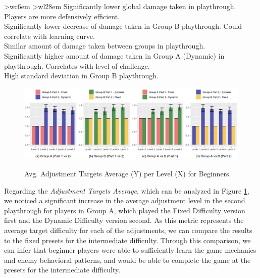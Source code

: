 \begin{table}[hbt!]
\begin{center}
\begin{tabular}{ >{\small}w{c}{6em} >{\footnotesize}w{l}{28em} }
        {
            \textbullet\space Significantly lower global damage taken in  playthrough. Players are more defensively efficient. \\ %
            \textbullet\space Significantly lower decrease of damage taken in Group B  playthrough. Could correlate with learning curve. \\ %
            \textbullet\space Similar amount of damage taken between groups in  playthrough. \\ %
            \textbullet\space Significantly higher amount of damage taken in Group A (Dynamic) in  playthrough. Correlates with level of challenge. \\ %
            \textbullet\space High standard deviation in Group B  playthrough. %
        } \\
        \bottomrule
      \end{tabular}
    \end{center}
\end{table}

\begin{figure}[ht]
    \begin{center}
    \caption{Avg. Adjustment Targets Average (Y) per Level (X) for Beginners.}
        \includegraphics[width=\textwidth]{figures/adjustment_target_level-beginner_players.png}
        \label{fig:result-metric-beginners-adjustment-target-level}
    \end{center}
\end{figure}

Regarding the \emph{Adjustment Targets Average}, which can be analyzed in Figure \ref{fig:result-metric-beginners-adjustment-target-level}, we noticed a significant increase in the average adjustment level in the second playthrough for players in Group A, which played the Fixed Difficulty version first and the Dynamic Difficulty version second. As this metric represents the average target difficulty for each of the adjustments, we can compare the results to the fixed presets for the intermediate difficulty. Through this comparison, we can infer that beginner players were able to sufficiently learn the game mechanics and enemy behavioral patterns, and would be able to complete the game at the presets for the intermediate difficulty.

